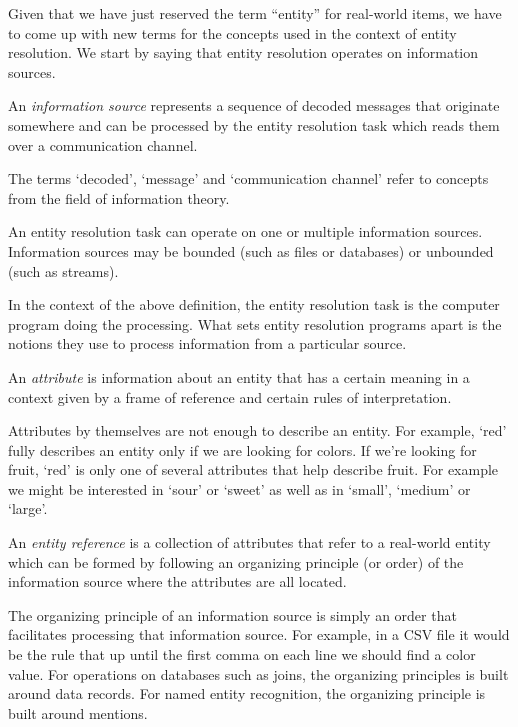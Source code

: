 \documentclass[11pt]{article}
\begin{document}
    Given that we have just reserved the term ``entity'' for real-world items,
    we have to come up with new terms for the concepts used in the context of
    entity resolution.
    We start by saying that entity resolution operates on information sources.

    \begin{defn}
        An \textit{information source} represents a sequence of decoded messages
        that originate somewhere and can be processed by the entity resolution
        task which reads them over a communication channel.
    \end{defn}

    The terms `decoded', `message' and `communication channel' refer to concepts
    from the field of information theory\cite{ash2012it}.
    
    An entity resolution task can operate on one or multiple information
    sources.
    Information sources may be bounded (such as files or databases) or unbounded
    (such as streams).
    
    In the context of the above definition, the entity resolution task is the
    computer program doing the processing.
    What sets entity resolution programs apart is the notions they use to
    process information from a particular source.

    \begin{defn}
        An \textit{attribute} is information about an entity that has a certain
        meaning in a context given by a frame of reference and certain rules of
        interpretation.
    \end{defn}

    Attributes by themselves are not enough to describe an entity.
    For example, `red' fully describes an entity only if we are looking for
    colors.
    If we're looking for fruit, `red' is only one of several attributes that
    help describe fruit.
    For example we might be interested in `sour' or `sweet' as well as in
    `small', `medium' or `large'.

    \begin{defn}
        An \textit{entity reference} is a collection of attributes that refer
        to a real-world entity which can be formed by following an organizing
        principle (or order) of the information source where the attributes are
        all located.
    \end{defn}

    The organizing principle of an information source is simply an order that
    facilitates processing that information source.
    For example, in a CSV file it would be the rule that up until the first
    comma on each line we should find a color value.
    For operations on databases such as joins, the organizing principles is
    built around data records.
    For named entity recognition, the organizing principle is built around
    mentions.
\end{document}
